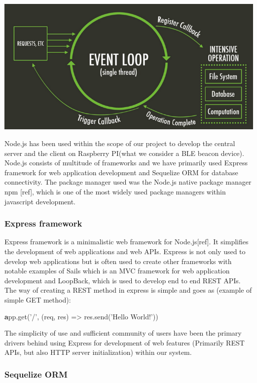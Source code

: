 \bigskip
\includegraphics[scale=0.3]{gfx/node} 
\bigskip

Node.js has been used within the scope of our project to develop the central server and the client on Raspberry PI(what we consider a BLE beacon device). Node.js consists of multitude of frameworks and we have primarily used Express framework for web application development and Sequelize ORM for database connectivity. The package manager used was the Node.js native package manager npm [ref], which is one of the most widely used package managers within javascript development.

\subsubsection{Express framework}
\label{subsubsec:express}

Express framework is a minimalistic web framework for Node.js[ref]. It simplifies the development of web applications and web APIs. Express is not only used to develop web applications but is often used to create other frameworks with notable examples of Sails which is an MVC framework for web application development and LoopBack, which is used to develop end to end REST APIs. The way of creating a REST method in express is simple and goes as (example of simple GET method):\newline 

\smallskip
{\textbf app.get('/', (req, res) => res.send('Hello World!'))}
\newline
\smallskip

The simplicity of use and sufficient community of users have been the primary drivers behind using Express for development of web features (Primarily REST APIs, but also HTTP server initialization) within our system.

\subsubsection{Sequelize ORM}
\label{subsubsec:sequelize}

